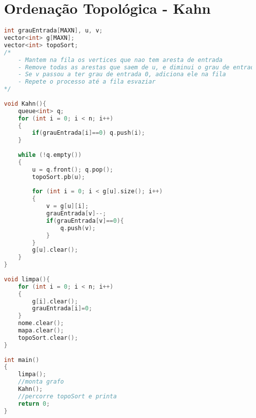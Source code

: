 \documentclass[12pt,a4paper,twoside]{report}
\begin{document}
\section{Ordenação Topológica - Kahn}
\noindent\begin{lstlisting}[caption=Ordenação Topológica - Kahn,language=C++]
int grauEntrada[MAXN], u, v;
vector<int> g[MAXN];
vector<int> topoSort;
/*
    - Mantem na fila os vertices que nao tem aresta de entrada
    - Remove todas as arestas que saem de u, e diminui o grau de entrada de cada vizinho v de u
    - Se v passou a ter grau de entrada 0, adiciona ele na fila
    - Repete o processo até a fila esvaziar
*/
 
void Kahn(){
    queue<int> q;
    for (int i = 0; i < n; i++)
    {
        if(grauEntrada[i]==0) q.push(i);
    }
     
    while (!q.empty())
    {
        u = q.front(); q.pop();
        topoSort.pb(u);
         
        for (int i = 0; i < g[u].size(); i++)
        {
            v = g[u][i];
            grauEntrada[v]--;
            if(grauEntrada[v]==0){
                q.push(v);
            }
        }     
        g[u].clear();
    }  
}
 
void limpa(){
    for (int i = 0; i < n; i++)
    {
        g[i].clear();
        grauEntrada[i]=0;
    }
    nome.clear();
    mapa.clear();
    topoSort.clear();
}
 
int main()
{
    limpa();
    //monta grafo
    Kahn();
    //percorre topoSort e printa
    return 0;
}
\end{lstlisting}
\end{document}
